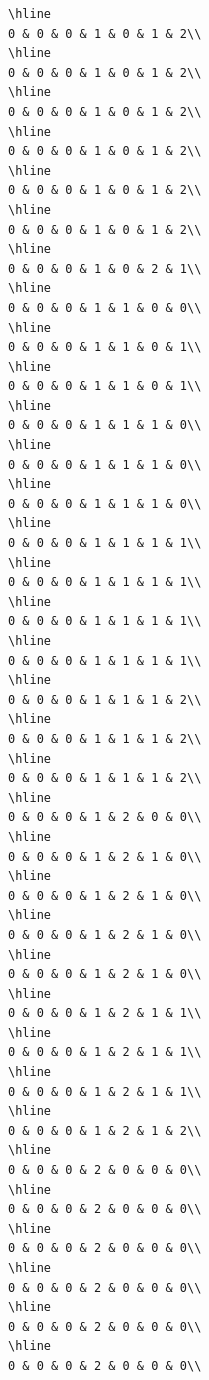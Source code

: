 \documentclass[
]{article}
\begin{document}
\begin{verbatim}
\hline
0 & 0 & 0 & 1 & 0 & 1 & 2\\
\hline
0 & 0 & 0 & 1 & 0 & 1 & 2\\
\hline
0 & 0 & 0 & 1 & 0 & 1 & 2\\
\hline
0 & 0 & 0 & 1 & 0 & 1 & 2\\
\hline
0 & 0 & 0 & 1 & 0 & 1 & 2\\
\hline
0 & 0 & 0 & 1 & 0 & 1 & 2\\
\hline
0 & 0 & 0 & 1 & 0 & 2 & 1\\
\hline
0 & 0 & 0 & 1 & 1 & 0 & 0\\
\hline
0 & 0 & 0 & 1 & 1 & 0 & 1\\
\hline
0 & 0 & 0 & 1 & 1 & 0 & 1\\
\hline
0 & 0 & 0 & 1 & 1 & 1 & 0\\
\hline
0 & 0 & 0 & 1 & 1 & 1 & 0\\
\hline
0 & 0 & 0 & 1 & 1 & 1 & 0\\
\hline
0 & 0 & 0 & 1 & 1 & 1 & 1\\
\hline
0 & 0 & 0 & 1 & 1 & 1 & 1\\
\hline
0 & 0 & 0 & 1 & 1 & 1 & 1\\
\hline
0 & 0 & 0 & 1 & 1 & 1 & 1\\
\hline
0 & 0 & 0 & 1 & 1 & 1 & 2\\
\hline
0 & 0 & 0 & 1 & 1 & 1 & 2\\
\hline
0 & 0 & 0 & 1 & 1 & 1 & 2\\
\hline
0 & 0 & 0 & 1 & 2 & 0 & 0\\
\hline
0 & 0 & 0 & 1 & 2 & 1 & 0\\
\hline
0 & 0 & 0 & 1 & 2 & 1 & 0\\
\hline
0 & 0 & 0 & 1 & 2 & 1 & 0\\
\hline
0 & 0 & 0 & 1 & 2 & 1 & 0\\
\hline
0 & 0 & 0 & 1 & 2 & 1 & 1\\
\hline
0 & 0 & 0 & 1 & 2 & 1 & 1\\
\hline
0 & 0 & 0 & 1 & 2 & 1 & 1\\
\hline
0 & 0 & 0 & 1 & 2 & 1 & 2\\
\hline
0 & 0 & 0 & 2 & 0 & 0 & 0\\
\hline
0 & 0 & 0 & 2 & 0 & 0 & 0\\
\hline
0 & 0 & 0 & 2 & 0 & 0 & 0\\
\hline
0 & 0 & 0 & 2 & 0 & 0 & 0\\
\hline
0 & 0 & 0 & 2 & 0 & 0 & 0\\
\hline
0 & 0 & 0 & 2 & 0 & 0 & 0\\

\end{verbatim}
\end{document}
